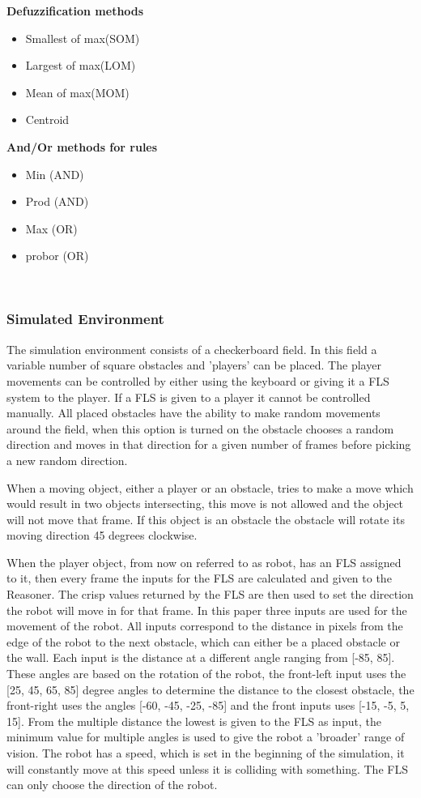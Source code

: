 \documentclass[conference]{IEEEtran}
\begin{document}
\textbf{Defuzzification methods}
\begin{itemize}
  \item Smallest of max(SOM)
  \item Largest of max(LOM)
  \item Mean of max(MOM)
  \item Centroid
\end{itemize}

\textbf{And/Or methods for rules}
\begin{itemize}
  \item Min (AND)
  \item Prod (AND)
  \item Max (OR)
  \item probor (OR)
\end{itemize}

\hfill\\
\subsubsection*{Simulated Environment}
The simulation environment consists of a checkerboard field. In this field a variable number of square obstacles and 'players' can be placed. The player movements can be controlled by either using the keyboard or giving it a FLS system to the player. If a FLS is given to a player it cannot be controlled manually.
All placed obstacles have the ability to make random movements around the field, when this option is turned on the obstacle chooses a random direction and moves in that direction for a given number of frames before picking a new random direction.

When a moving object, either a player or an obstacle, tries to make a move which would result in two objects intersecting, this move is not allowed and the object will not move that frame. If this object is an obstacle the obstacle will rotate its moving direction 45 degrees clockwise.

When the player object, from now on referred to as robot, has an FLS assigned to it, then every frame the inputs for the FLS are calculated and given to the Reasoner. The crisp values returned by the FLS are then used to set the direction the robot will move in for that frame. In this paper three inputs are used for the movement of the robot. All inputs correspond to the distance in pixels from the edge of the robot to the next obstacle, which can either be a placed obstacle or the wall. Each input is the distance at a different angle ranging from [-85, 85]. These angles are based on the rotation of the robot, the front-left input uses the [25, 45, 65, 85] degree angles to determine the distance to the closest obstacle, the front-right uses the angles [-60, -45, -25, -85] and the front inputs uses [-15, -5, 5, 15]. From the multiple distance the lowest is given to the FLS as input, the minimum value for multiple angles is used to give the robot a 'broader' range of vision. The robot has a speed, which is set in the beginning of the simulation, it will constantly move at this speed unless it is colliding with something. The FLS can only choose the direction of the robot.
\end{document}
